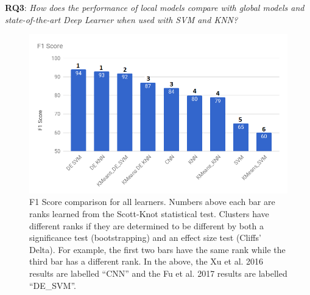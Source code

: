 \documentclass[sigconf]{acmart}
\theoremstyle{break}
\begin{document}
     
      
    
    
    
    
    \textbf{RQ3}: {\em  How does the performance of local models compare with global models and state-of-the-art Deep Learner when used with SVM and KNN?} 
    
    
       
    
     
    \begin{figure}
        \centering
        \includegraphics[width=\linewidth]{fig/f-score.png}
        \caption{F1 Score comparison for all learners. Numbers above each bar are ranks learned from the Scott-Knot statistical test. Clusters have different ranks if they are determined to be different
        by both a significance test (bootstrapping) and an effect size test (Cliffs' Delta). For example, the first two bars have the same rank while the third bar has a different rank. In the above,
        the Xu et al. 2016 results are labelled ``CNN'' and the Fu et al. 2017
        results are labelled ``DE\_SVM''.}
        \label{fig:F1-Score}
    \end{figure}
    
\end{document}
